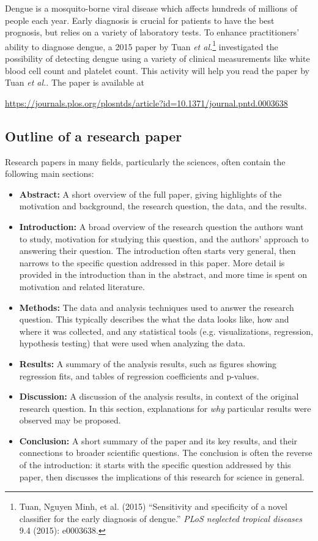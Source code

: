 \documentclass[11pt]{article}
\begin{document}
Dengue is a mosquito-borne viral disease which affects hundreds of millions of people each year. Early diagnosis is crucial for patients to have the best prognosis, but relies on a variety of laboratory tests. To enhance practitioners' ability to diagnose dengue, a 2015 paper by Tuan \textit{et al.}\footnote{Tuan, Nguyen Minh, et al. (2015) ``Sensitivity and specificity of a novel classifier for the early diagnosis of dengue.'' \textit{PLoS neglected tropical diseases} 9.4 (2015): e0003638.}  investigated the possibility of detecting dengue using a variety of clinical measurements like white blood cell count and platelet count. This activity will help you read the paper by Tuan \textit{et al.}. The paper is available at

\url{https://journals.plos.org/plosntds/article?id=10.1371/journal.pntd.0003638}

\subsection*{Outline of a research paper}

Research papers in many fields, particularly the sciences, often contain the following main sections:

\begin{itemize}
\item  \textbf{Abstract:} A short overview of the full paper, giving highlights of the motivation and background, the research question, the data, and the results.
\item \textbf{Introduction:} A broad overview of the research question the authors want to study, motivation for studying this question, and the authors' approach to answering their question. The introduction often starts very general, then narrows to the specific question addressed in this paper. More detail is provided in the introduction than in the abstract, and more time is spent on motivation and related literature.
\item \textbf{Methods:} The data and analysis techniques used to answer the research question. This typically describes the what the data looks like, how and where it was collected, and any statistical tools (e.g. visualizations, regression, hypothesis testing) that were used when analyzing the data.
\item \textbf{Results:} A summary of the analysis results, such as figures showing regression fits, and tables of regression coefficients and p-values.
\item \textbf{Discussion:} A discussion of the analysis results, in context of the original research question. In this section, explanations for \textit{why} particular results were observed may be proposed.
\item \textbf{Conclusion:} A short summary of the paper and its key results, and their connections to broader scientific questions. The conclusion is often the reverse of the introduction: it starts with the specific question addressed by this paper, then discusses the implications of this research for science in general.
\end{itemize}
\end{document}
